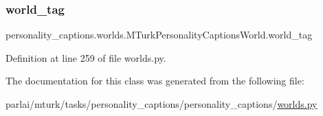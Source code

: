 \subsubsection{\texorpdfstring{world\+\_\+tag}{world\_tag}}
{\footnotesize\ttfamily personality\+\_\+captions.\+worlds.\+M\+Turk\+Personality\+Captions\+World.\+world\+\_\+tag}



Definition at line 259 of file worlds.\+py.



The documentation for this class was generated from the following file\+:\begin{DoxyCompactItemize}
\item 
parlai/mturk/tasks/personality\+\_\+captions/personality\+\_\+captions/\hyperlink{parlai_2mturk_2tasks_2personality__captions_2personality__captions_2worlds_8py}{worlds.\+py}\end{DoxyCompactItemize}
